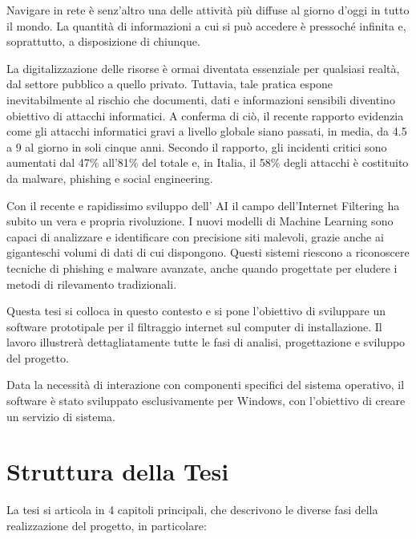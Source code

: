 \documentclass[12pt,a4paper,openright,twoside]{book}
\begin{document}

\phantom{Introduzione}
\label{chap:introduzione}

Navigare in rete è senz'altro una delle attività più diffuse al giorno d'oggi in tutto il mondo.
La quantità di informazioni a cui si può accedere è pressoché infinita e, soprattutto, a disposizione di chiunque.

La digitalizzazione delle risorse è ormai diventata essenziale per qualsiasi realtà, dal settore pubblico a quello privato.
Tuttavia, tale pratica espone inevitabilmente al rischio che documenti,
dati e informazioni sensibili diventino obiettivo di attacchi informatici.
A conferma di ciò, il recente rapporto \cite{clusit2024-sicurezza} evidenzia come gli attacchi informatici gravi a livello globale siano passati,
in media, da 4.5 a 9 al giorno in soli cinque anni.
Secondo il rapporto, gli incidenti critici sono aumentati dal 47\% all'81\% del totale e,
in Italia, il 58\% degli attacchi è costituito da malware, phishing e social engineering.

Con il recente e rapidissimo sviluppo dell' \gls{AI} il campo dell'Internet Filtering ha subito un vera e propria rivoluzione.
I nuovi modelli di Machine Learning sono capaci di analizzare e identificare con precisione siti malevoli,
grazie anche ai giganteschi volumi di dati di cui dispongono.
Questi sistemi riescono a riconoscere tecniche di phishing e malware avanzate, anche quando progettate per eludere i metodi di rilevamento tradizionali.

Questa tesi si colloca in questo contesto e si pone l'obiettivo di sviluppare un software prototipale per il filtraggio internet sul computer di installazione.
Il lavoro illustrerà dettagliatamente tutte le fasi di analisi, progettazione e sviluppo del progetto.

Data la necessità di interazione con componenti specifici del sistema operativo,
il software è stato sviluppato esclusivamente per Windows, con l'obiettivo di creare un servizio di sistema.

\section*{Struttura della Tesi}

La tesi si articola in 4 capitoli principali, che descrivono le diverse fasi della realizzazione del progetto, in particolare:
\end{document}
